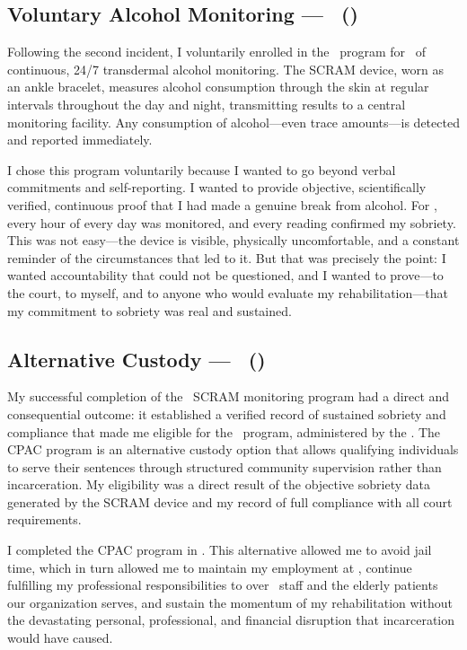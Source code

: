 \subsection{Voluntary Alcohol Monitoring --- \SCRAMProgramShort\ (\SCRAMDuration)}

Following the second incident, I voluntarily enrolled in the \SCRAMProgram\ program for \SCRAMDuration\ of continuous, 24/7 transdermal alcohol monitoring. The SCRAM device, worn as an ankle bracelet, measures alcohol consumption through the skin at regular intervals throughout the day and night, transmitting results to a central monitoring facility. Any consumption of alcohol---even trace amounts---is detected and reported immediately.

I chose this program voluntarily because I wanted to go beyond verbal commitments and self-reporting. I wanted to provide objective, scientifically verified, continuous proof that I had made a genuine break from alcohol. For \SCRAMDuration, every hour of every day was monitored, and every reading confirmed my sobriety. This was not easy---the device is visible, physically uncomfortable, and a constant reminder of the circumstances that led to it. But that was precisely the point: I wanted accountability that could not be questioned, and I wanted to prove---to the court, to myself, and to anyone who would evaluate my rehabilitation---that my commitment to sobriety was real and sustained.

\subsection{Alternative Custody --- \CPACProgramShort\ (\CPACDuration)}

My successful completion of the \SCRAMDuration\ SCRAM monitoring program had a direct and consequential outcome: it established a verified record of sustained sobriety and compliance that made me eligible for the \CPACProgram\ program, administered by the \CPACAdmin. The CPAC program is an alternative custody option that allows qualifying individuals to serve their sentences through structured community supervision rather than incarceration. My eligibility was a direct result of the objective sobriety data generated by the SCRAM device and my record of full compliance with all court requirements.

I completed the CPAC program in \CPACDuration. This alternative allowed me to avoid jail time, which in turn allowed me to maintain my employment at \EmployerName, continue fulfilling my professional responsibilities to over \TeamSize\ staff and the elderly patients our organization serves, and sustain the momentum of my rehabilitation without the devastating personal, professional, and financial disruption that incarceration would have caused.

